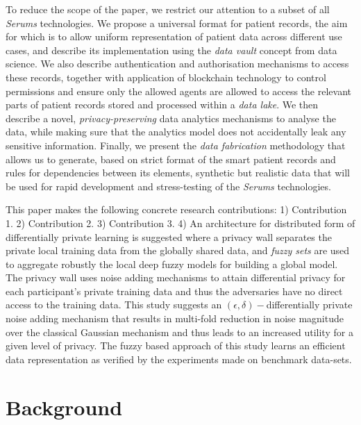 To reduce the scope of the paper, we restrict our attention to a subset of all \emph{Serums} technologies. We propose a universal format for patient records, the aim for which is to allow uniform representation of patient data across different use cases, and describe its implementation using the \emph{data vault} concept from data science. We also describe authentication and authorisation mechanisms to access these records, together with application of blockchain technology to control permissions and ensure only the allowed agents are allowed to access the relevant parts of patient records stored and processed within a \emph{data lake}. We then describe a novel, \emph{privacy-preserving} data analytics mechanisms to analyse the data, while making sure that the analytics model does not accidentally leak any sensitive information. Finally, we present the \emph{data fabrication} methodology that allows us to generate, based on strict format of the smart patient records and rules for dependencies between its elements, synthetic but realistic data that will be used for rapid development and stress-testing of the \emph{Serums} technologies.


This paper makes the following concrete research contributions: 1) Contribution 1. 2) Contribution 2. 3) Contribution 3. 4) An architecture for distributed form of differentially private learning is suggested where a privacy wall separates the private local training data from the globally shared data, and \emph{fuzzy sets} are used to aggregate robustly the local deep fuzzy models for building a global model. The privacy wall uses noise adding mechanisms to attain differential privacy for each participant's private training data and thus the adversaries have no direct access to the training data. This study suggests an $(\epsilon,\delta)-$differentially private noise adding mechanism that results in multi-fold reduction in noise magnitude over the classical Gaussian mechanism and thus leads to an increased utility for a given level of privacy. The fuzzy based approach of this study learns an efficient data representation as verified by the experiments made on benchmark data-sets. 


\section{Background}

